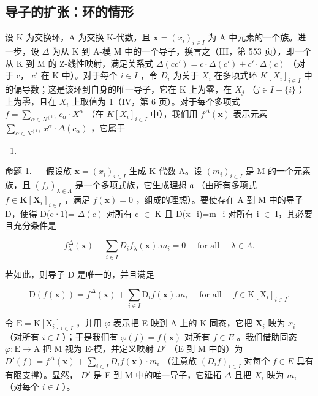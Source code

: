 \subsection{导子的扩张：环的情形}

设 K 为交换环，A 为交换 K-代数，且 \(\mathbf{x} = (x_i)_{i \in I}\) 为 A 中元素的一个族。进一步，设 \(\Delta\) 为从 K 到 A-模 M 中的一个导子，换言之（III，第 553 页），即一个从 K 到 M 的 Z-线性映射，满足关系式 \(\Delta(cc') = c \cdot \Delta(c') + c' \cdot \Delta(c)\) （对于 c， \(c'\) 在 K 中）。对于每个 \(i \in I\) ，令 \(D_i\) 为关于 \(X_i\) 在多项式环 \(K[X_i]_{i \in I}\) 中的偏导数；这是该环到自身的唯一导子，它在 K 上为零，在 \(X_j\) （\(j \in I - \{i\}\) ）上为零，且在 \(X_i\) 上取值为 1（IV，第 6 页）。对于每个多项式 \(f = \sum_{\alpha \in N^{(1)}} c_\alpha \cdot X^\alpha\) （在 \(K[X_i]_{i \in I}\) 中），我们用 \(f^\Delta(\mathbf{x})\) 表示元素 \(\sum_{\alpha \in N^{(1)}} x^\alpha \cdot \Delta(c_\alpha)\) ，它属于

\begin{enumerate}
\def\labelenumi{\Alph{enumi}.}
\setcounter{enumi}{12}
\tightlist
\item
\end{enumerate}

命题 1. --- 假设族 \(\mathbf{x} = (x_i)_{i \in I}\) 生成 K-代数 A。设 \((m_i)_{i \in I}\) 是 M 的一个元素族，且 \((f_\lambda)_{\lambda \in \Lambda}\) 是一个多项式族，它生成理想 \(\mathfrak{a}\) （由所有多项式 \(f \in \mathbf{K}[\mathbf{X}_i]_{i \in I}\) ，满足 \(f(\mathbf{x}) = 0\) ，组成的理想）。要使存在 A 到 M 中的导子 D，使得 D(c·1)= \(\Delta(c)\) 对所有 c \(\in\) K 且 D(x\_i)=m\_i 对所有 i \(\in\) I，其必要且充分条件是

\[
f _ {\lambda} ^ {\Delta} (\mathbf {x}) + \sum_ {i \in I} D _ {i} f _ {\lambda} (\mathbf {x}). m _ {i} = 0 \quad \text { for   all } \quad \lambda \in \Lambda .\tag{1}
\]

若如此，则导子 D 是唯一的，并且满足

\[
\mathrm{D} (f (\mathbf {x})) = f ^ {\Delta} (\mathbf {x}) + \sum_ {i \in I} \mathrm{D} _ {i} f (\mathbf {x}). m _ {i} \quad \text { for   all } \quad f \in \mathrm{K} [ \mathrm{X} _ {i} ] _ {i \in I}.\tag{2}
\]

令 \(\mathrm{E} = \mathrm{K}[\mathrm{X}_i]_{i \in I}\) ，并用 \(\varphi\) 表示把 E 映到 A 上的 K-同态，它把 \(\mathbf{X}_i\) 映为 \(x_i\) （对所有 \(i \in I\) ）；于是我们有 \(\varphi(f) = f(\mathbf{x})\) 对所有 \(f \in E\) 。我们借助同态 \(\varphi: \mathrm{E} \to \mathrm{A}\) 把 M 视为 E-模，并定义映射 \(D'\) （E 到 M 中的）为 \(D'(f) = f^{\Delta}(\mathbf{x}) + \sum_{i \in I} D_i f(\mathbf{x}) \cdot m_i\) （注意族 \((D_i f)_{i \in I}\) 对每个 \(f \in E\) 具有有限支撑）。显然， \(D'\) 是 E 到 M 中的唯一导子，它延拓 \(\Delta\) 且把 \(X_i\) 映为 \(m_i\) （对每个 \(i \in I\) ）。

